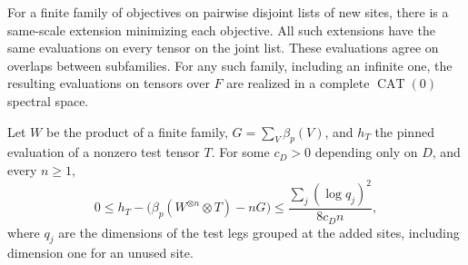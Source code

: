 \begin{lemma}\label{lem:pinning}
For a finite family of objectives on pairwise disjoint lists of new sites,
there is a same-scale extension minimizing each objective. All such
extensions have the same evaluations on every tensor on the joint list.
These evaluations agree on overlaps between subfamilies. For any such
family, including an infinite one, the resulting evaluations on tensors
over \(F\) are realized in a complete \(\operatorname{CAT}(0)\) spectral
space.

Let \(W\) be the product of a finite family, \(G=\sum_V\beta_p(V)\),
and \(h_T\) the pinned evaluation of a nonzero test tensor \(T\).
For some \(c_D>0\) depending only on \(D\), and every \(n\ge1\),
\begin{equation}\label{eq:prices-pin-limit}
 0\le h_T-\bigl(\beta_p(W^{\otimes n}\otimes T)-nG\bigr)
 \le\frac{\sum_j(\log q_j)^2}{8c_D n},
\end{equation}
where \(q_j\) are the dimensions of the test legs grouped at the added
sites, including dimension one for an unused site.
\end{lemma}

